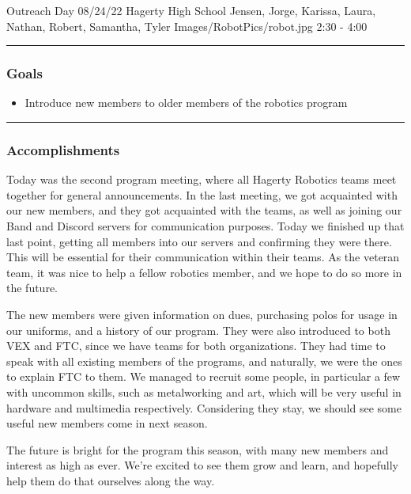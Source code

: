 \insertmeeting 
	{Outreach Day} 
	{08/24/22}
	{Hagerty High School}
	{Jensen, Jorge, Karissa, Laura, Nathan, Robert, Samantha, Tyler}
	{Images/RobotPics/robot.jpg}
	{2:30 - 4:00}
	
\noindent\hfil\rule{\textwidth}{.4pt}\hfil
\subsubsection*{Goals}
\begin{itemize}
    \item Introduce new members to older members of the robotics program
    
\end{itemize} 

\noindent\hfil\rule{\textwidth}{.4pt}\hfil

\subsubsection*{Accomplishments}
Today was the second program meeting, where all Hagerty Robotics teams meet together for general announcements. In the last meeting, we got acquainted with our new members, and they got acquainted with the teams, as well as joining our Band and Discord servers for communication purposes. Today we finished up that last point, getting all members into our servers and confirming they were there. This will be essential for their communication within their teams. As the veteran team, it was nice to help a fellow robotics member, and we hope to do so more in the future.

The new members were given information on dues, purchasing polos for usage in our uniforms, and a history of our program. They were also introduced to both VEX and FTC, since we have teams for both organizations. They had time to speak with all existing members of the programs, and naturally, we were the ones to explain FTC to them. We managed to recruit some people, in particular a few with uncommon skills, such as metalworking and art, which will be very useful in hardware and multimedia respectively. Considering they stay, we should see some useful new members come in next season.

The future is bright for the program this season, with many new members and interest as high as ever. We're excited to see them grow and learn, and hopefully help them do that ourselves along the way.





